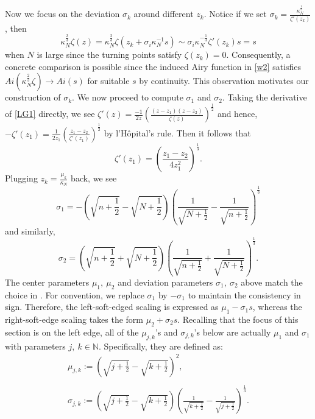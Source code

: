 \documentclass[11pt]{article}
\numberwithin{equation}{section}%
\numberwithin{theorem}{section}
\begin{document}
Now we focus on the deviation $\sigma_k$ around different $z_k$. Notice if we set $\sigma_k=\frac{\kappa_N^{\frac{1}{3}}}{\zeta'(z_k)}$, then
\begin{equation*}
    \kappa_N^{\frac{2}{3}}\zeta(z)=\kappa_N^{\frac{2}{3}}\zeta\left(z_k+\sigma_i\kappa_N^{-1}s\right)\sim\sigma_i\kappa_N^{-\frac{1}{3}}\zeta'(z_k)s=s
\end{equation*}
when $N$ is large since the turning points satisfy $\zeta(z_k)=0$. Consequently, a concrete comparison is possible since the induced Airy function in \eqref{w2} satisfies $Ai\left(\kappa_{N}^{\frac{2}{3}}\zeta\right)\rightarrow Ai(s)$ for suitable $s$ by continuity. This observation motivates our construction of $\sigma_k$. We now proceed to compute $\sigma_1$ and $\sigma_2$. Taking the derivative of \eqref{LG1} directly, we see $\zeta'(z)=\frac{-1}{2z}\left(\frac{(z-z_1)(z-z_2)}{\zeta(z)}\right)^{\frac{1}{2}}$
and hence, $ -\zeta'(z_1)=\frac{1}{2z_1}\left(\frac{z_1-z_2}{\zeta'(z_1)}\right)^{\frac{1}{2}}$ by l'H{\^o}pital's rule. Then it follows that
\begin{equation*}
    \zeta'(z_1)=\left(\frac{z_1-z_2}{4z_1^2}\right)^{\frac{1}{3}}.
\end{equation*}
Plugging $z_k=\frac{\mu_k}{\kappa_N}$ back, we see
\begin{equation*}
    \sigma_1=-\left(\sqrt{n+\frac{1}{2}}-\sqrt{N+\frac{1}{2}}\right)\left(\frac{1}{\sqrt{N+\frac{1}{2}}}-\frac{1}{\sqrt{n+\frac{1}{2}}}\right)^{\frac{1}{3}}
\end{equation*}
and similarly,
\begin{equation*}
    \sigma_2=\left(\sqrt{n+\frac{1}{2}}+\sqrt{N+\frac{1}{2}}\right)\left(\frac{1}{\sqrt{n+\frac{1}{2}}}+\frac{1}{\sqrt{N+\frac{1}{2}}}\right)^{\frac{1}{3}}.
\end{equation*}
The center parameters $\mu_1,~\mu_2$ and deviation parameters $\sigma_1,~\sigma_2$ above match the choice in \cite{johnstone2001distribution}. For convention, we replace $\sigma_1$ by $-\sigma_1$ to maintain the consistency in sign. Therefore, the left-soft-edged scaling is expressed as $\mu_1-\sigma_1s$, whereas the right-soft-edge scaling takes the form $\mu_2+\sigma_2s$. Recalling that the focus of this section is on the left edge, all of the $\mu_{j,k}$'s and $\sigma_{j,k}$'s below are actually $\mu_1$ and $\sigma_1$ with parameters $j,~k\in\mathbb{N}$. Specifically, they are defined as:
\begin{equation*}
    \begin{array}{ll}
        \mu_{j,k}:=\left(\sqrt{j+\frac{1}{2}}-\sqrt{k+\frac{1}{2}}\right)^2,\\
        \\
        \sigma_{j,k}:=\left(\sqrt{j+\frac{1}{2}}-\sqrt{k+\frac{1}{2}}\right)\left(\frac{1}{\sqrt{k+\frac{1}{2}}}-\frac{1}{\sqrt{j+\frac{1}{2}}}\right)^{\frac{1}{3}}.
    \end{array}
\end{equation*}
\end{document}
